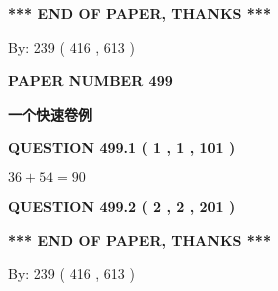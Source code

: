 \documentclass{ctexart}
\begin{document}
   
 \vspace{0.2in}
 
   
   
   
   
\vspace{1.0in} 
{\textbf{\large{ *** END OF PAPER, THANKS *** }}} 
   
   
\hspace{1.0in} By: 
 239 ( 416 ,  613 )
   
   
   
   
\newpage 
\setcounter{page}{ 
   499001 } 
   
   
   
   
 {\textbf{ \Large{ PAPER NUMBER  499  }}}
   
   
\vspace{0.2in}
   
   
   
   
   
   
 \vspace{0.2in}
{\LARGE {\textbf{ 一个快速卷例}}}
   
   
  
\vspace{0.2in}
  
{\textbf{\Large{QUESTION
499.1 
 ( 1 , 1 , 101 )
}}}
  
  
 
 

$ %
36 +  %
54=   %
90$
 
 
  
\vspace{0.2in}
  
{\textbf{\Large{QUESTION
499.2 
 ( 2 , 2 , 201 )
}}}
  
  
   
   
 \vspace{0.2in}
 
   
   
   
   
\vspace{1.0in} 
{\textbf{\large{ *** END OF PAPER, THANKS *** }}} 
   
   
\hspace{1.0in} By: 
 239 ( 416 ,  613 )
   
   
   
   
\newpage 
\setcounter{page}{ 
   500001 } 
   
   
   
\end{document}
